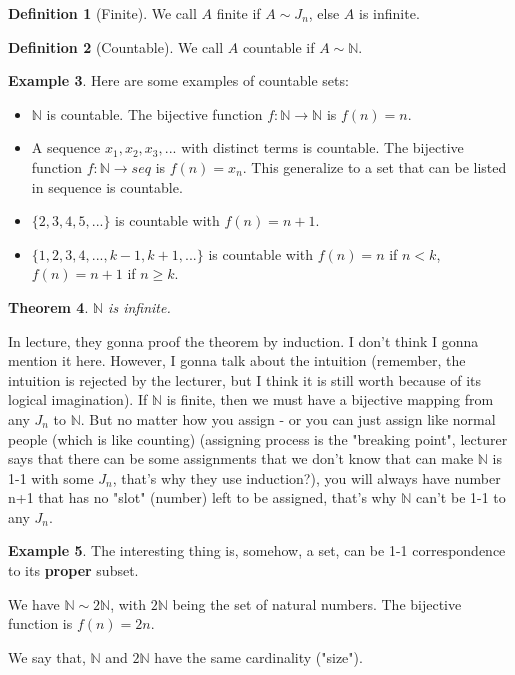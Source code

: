 \documentclass[12pt]{article}
\newcommand{\NN}{\mathbb{N}}   %
\theoremstyle{definition}
\newtheorem{definition}{Definition}[section]
\newtheorem{example}[definition]{Example}
\theoremstyle{plain}
\newtheorem{theorem}[definition]{Theorem}
\begin{document}
\begin{definition}[Finite]
We call $A$ finite if $A\sim J_n$, else $A$ is infinite.
\end{definition}

\begin{definition}[Countable]
We call $A$ countable if $A\sim \NN$.
\end{definition}

\begin{example}
Here are some examples of countable sets:
\begin{itemize}
    \item $\NN$ is countable. The bijective function $f: \NN \rightarrow \NN$ is $f(n) = n$.
    \item A sequence $x_1, x_2,x_3,...$ with distinct terms is countable. The bijective function $f: \NN \rightarrow seq$ is $f(n) = x_n$. This generalize to a set that can be listed in sequence is countable.
    \item $\{2,3,4,5,...\}$ is countable with $f(n) = n + 1$.
    \item $\{1,2,3,4,...,k-1,k+1,...\}$ is countable with $f(n) = n$ if $n<k$, $f(n) = n+1$ if $n\ge k$.
\end{itemize}
\end{example}

\begin{theorem}
$\NN$ is infinite.
\end{theorem}

\begin{note}
In lecture, they gonna proof the theorem by induction. I don't think I gonna mention it here. However, I gonna talk about the intuition (remember, the intuition is rejected by the lecturer, but I think it is still worth because of its logical imagination). If $\NN$ is finite, then we must have a bijective mapping from any $J_n$ to $\NN$. But no matter how you assign - or you can just assign like normal people (which is like counting) (assigning process is the "breaking point", lecturer says that there can be some assignments that we don't know that can make $\NN$ is 1-1 with some $J_n$, that's why they use induction?), you will always have number n+1 that has no "slot" (number) left to be assigned, that's why $\NN$ can't be 1-1 to any $J_n$.
\end{note}

\begin{example}
The interesting thing is, somehow, a set, can be 1-1 correspondence to its \textbf{proper} subset.

We have $\NN \sim 2\NN$, with $2\NN$ being the set of natural numbers. The bijective function is $f(n) = 2n$.

We say that, $\NN$ and $2\NN$ have the same cardinality ("size").
\end{example}
\end{document}
